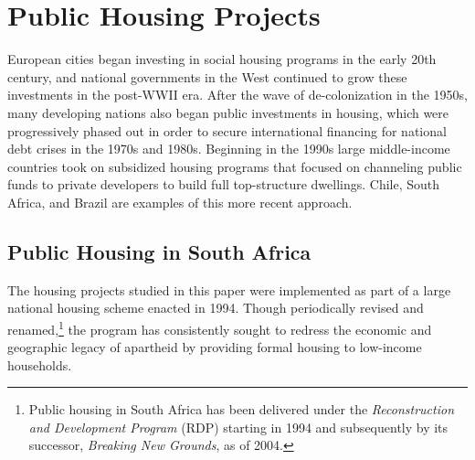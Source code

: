 \documentclass[12pt]{article}
\begin{document}
\section{Public Housing Projects}\label{section:background}


European cities began investing in social housing programs in the early 20th century, and national governments in the West continued to grow these investments in the post-WWII era. After the wave of de-colonization in the 1950s, many developing nations also began public investments in housing, which were progressively phased out in order to secure international financing for national debt crises in the 1970s and 1980s. Beginning in the 1990s large middle-income countries took on subsidized housing programs that focused on channeling public funds to private developers to build full top-structure dwellings. Chile, South Africa, and Brazil are examples of this more recent approach.


\subsection{Public Housing in South Africa}


The housing projects studied in this paper were implemented as part of a large national housing scheme enacted in 1994. Though periodically revised and renamed,\footnote{Public housing in South Africa has been delivered under the {\it Reconstruction and Development Program} (RDP) starting in 1994 and subsequently by its successor, {\it Breaking New Grounds}, as of 2004.} the program has consistently sought to redress the economic and geographic legacy of apartheid by providing formal housing to low-income households.
\end{document}
